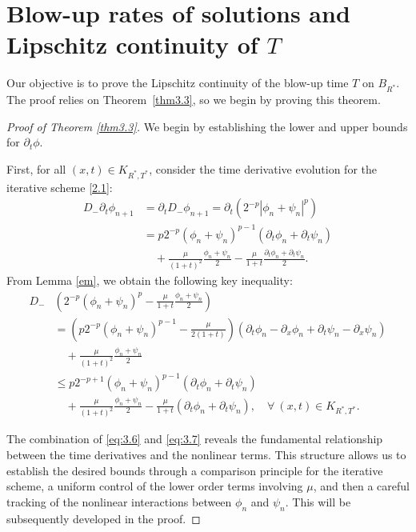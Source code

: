\documentclass[
  sn-mathphys-num,
  colorlinks,
  linkcolor=darkmagenta,
  citecolor=rufous,
  urlcolor=zaffre,
  hypertexnames=false
]{sn-jnl}
\numberwithin{equation}{section}
\begin{document}
\section{Blow-up rates of solutions and Lipschitz continuity of \texorpdfstring{$T$}{T}}\label{sec5}

Our objective is to prove the Lipschitz continuity of the blow-up time $T$ on $B_{R^*}$. The proof relies on Theorem~\ref{thm3.3}, so we begin by proving this theorem.
\begin{proof}[Proof of Theorem \ref{thm3.3}]
We begin by establishing the lower and upper bounds for $\partial_t \phi$. 

First, for all $(x,t) \in K_{R^*,T^*}$, consider the time derivative evolution for the iterative scheme \eqref{2.1}:
\begin{equation}\label{eq:3.6}
\begin{aligned}
D_- \partial_t \phi_{n+1} &= \partial_t D_- \phi_{n+1} = \partial_t \left(2^{-p}|\phi_n + \psi_n|^p\right) \\
&= p2^{-p}(\phi_n + \psi_n)^{p-1}(\partial_t \phi_n + \partial_t \psi_n) \\
&\quad + \frac{\mu}{(1+t)^2}\frac{\phi_n + \psi_n}{2} - \frac{\mu}{1+t}\frac{\partial_t \phi_n + \partial_t \psi_n}{2}.
\end{aligned}
\end{equation}
From Lemma \ref{em}, we obtain the following key inequality:
\begin{equation}\label{eq:3.7}
\begin{aligned}
D_- &\left(2^{-p}(\phi_n + \psi_n)^p - \frac{\mu}{1+t}\frac{\phi_n + \psi_n}{2}\right) \\
&= \left(p2^{-p}(\phi_n + \psi_n)^{p-1} - \frac{\mu}{2(1+t)}\right) 
   (\partial_t \phi_n - \partial_x \phi_n + \partial_t \psi_n - \partial_x \psi_n) \\
&\quad + \frac{\mu}{(1+t)^2}\frac{\phi_n + \psi_n}{2} \\
&\leq p2^{-p+1}(\phi_n + \psi_n)^{p-1}(\partial_t \phi_n + \partial_t \psi_n) \\
&\quad + \frac{\mu}{(1+t)^2}\frac{\phi_n + \psi_n}{2} - \frac{\mu}{1+t}(\partial_t \phi_n + \partial_t \psi_n), \quad \forall \ (x,t) \in K_{R^*,T^*}.
\end{aligned}
\end{equation}

The combination of \eqref{eq:3.6} and \eqref{eq:3.7} reveals the fundamental relationship between the time derivatives and the nonlinear terms. This structure allows us to establish the desired bounds through a comparison principle for the iterative scheme, a uniform control of the lower order terms involving $\mu$, and then a careful tracking of the nonlinear interactions between $\phi_n$ and $\psi_n$. This will be subsequently developed in the proof.


\end{proof}
\end{document}
